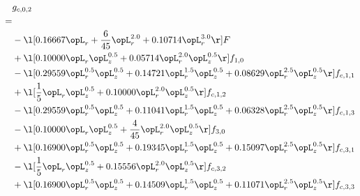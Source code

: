 \begin{alignat}{2} 
\label{eq:g_02_0} 
& g_{c,0,2} \nonumber \\ 
 = \\ 
& - \l[  0.16667 \opL_r + \frac{6}{45} \opL_r^{2.0} +  0.10714 \opL_r^{3.0}  \r] F \nonumber \\ 
& + \l[  0.10000 \opL_r \opL_z^{0.5} +  0.05714 \opL_r^{2.0} \opL_z^{0.5}  \r] f_{1,0} \nonumber \\ 
& - \l[  0.29559 \opL_r^{0.5} \opL_z^{0.5} +  0.14721 \opL_r^{1.5} \opL_z^{0.5} +  0.08629 \opL_r^{2.5} \opL_z^{0.5}  \r] f_{c,1,1} \nonumber \\ 
& + \l[ \frac{1}{5} \opL_r \opL_z^{0.5} +  0.10000 \opL_r^{2.0} \opL_z^{0.5}  \r] f_{c,1,2} \nonumber \\ 
& - \l[  0.29559 \opL_r^{0.5} \opL_z^{0.5} +  0.11041 \opL_r^{1.5} \opL_z^{0.5} +  0.06328 \opL_r^{2.5} \opL_z^{0.5}  \r] f_{c,1,3} \nonumber \\ 
& - \l[  0.10000 \opL_r \opL_z^{0.5} + \frac{4}{45} \opL_r^{2.0} \opL_z^{0.5}  \r] f_{3,0} \nonumber \\ 
& + \l[  0.16900 \opL_r^{0.5} \opL_z^{0.5} +  0.19345 \opL_r^{1.5} \opL_z^{0.5} +  0.15097 \opL_r^{2.5} \opL_z^{0.5}  \r] f_{c,3,1} \nonumber \\ 
& - \l[ \frac{1}{5} \opL_r \opL_z^{0.5} +  0.15556 \opL_r^{2.0} \opL_z^{0.5}  \r] f_{c,3,2} \nonumber \\ 
& + \l[  0.16900 \opL_r^{0.5} \opL_z^{0.5} +  0.14509 \opL_r^{1.5} \opL_z^{0.5} +  0.11071 \opL_r^{2.5} \opL_z^{0.5}  \r] f_{c,3,3} \nonumber \\ 
\end{alignat} 


